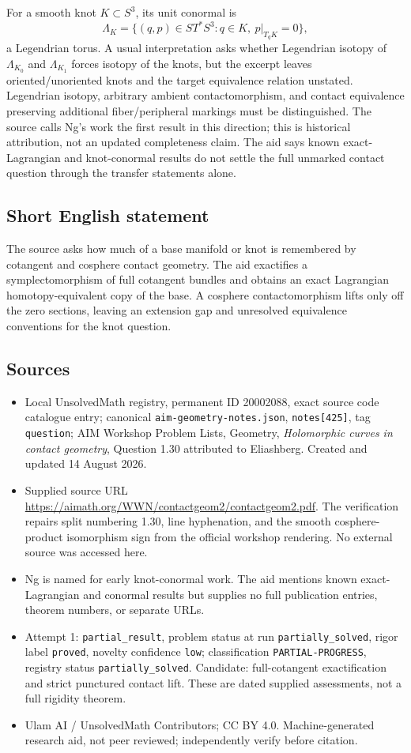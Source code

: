 \documentclass[11pt]{article}
\begin{document}
For a smooth knot \(K\subset S^3\), its unit conormal is
\[
 \Lambda_K=\{(q,p)\in ST^*S^3:q\in K,\ p|_{T_qK}=0\},
\]
a Legendrian torus. A usual interpretation asks whether Legendrian isotopy of \(\Lambda_{K_0}\) and \(\Lambda_{K_1}\) forces isotopy of the knots, but the excerpt leaves oriented/unoriented knots and the target equivalence relation unstated. Legendrian isotopy, arbitrary ambient contactomorphism, and contact equivalence preserving additional fiber/peripheral markings must be distinguished. The source calls Ng's work the first result in this direction; this is historical attribution, not an updated completeness claim. The aid says known exact-Lagrangian and knot-conormal results do not settle the full unmarked contact question through the transfer statements alone.
\subsection{Short English statement}
The source asks how much of a base manifold or knot is remembered by cotangent and cosphere contact geometry. The aid exactifies a symplectomorphism of full cotangent bundles and obtains an exact Lagrangian homotopy-equivalent copy of the base. A cosphere contactomorphism lifts only off the zero sections, leaving an extension gap and unresolved equivalence conventions for the knot question.
\subsection{Sources}
\begin{itemize}
\item Local UnsolvedMath registry, permanent ID 20002088, exact source code catalogue entry; canonical \texttt{aim-geometry-notes.json}, \texttt{notes[425]}, tag \texttt{question}; AIM Workshop Problem Lists, Geometry, \emph{Holomorphic curves in contact geometry}, Question 1.30 attributed to Eliashberg. Created and updated 14 August 2026.
\item Supplied source URL \url{https://aimath.org/WWN/contactgeom2/contactgeom2.pdf}. The verification repairs split numbering 1.30, line hyphenation, and the smooth cosphere-product isomorphism sign from the official workshop rendering. No external source was accessed here.
\item Ng is named for early knot-conormal work. The aid mentions known exact-Lagrangian and conormal results but supplies no full publication entries, theorem numbers, or separate URLs.
\item Attempt 1: \texttt{partial\_result}, problem status at run \texttt{partially\_solved}, rigor label \texttt{proved}, novelty confidence \texttt{low}; classification \texttt{PARTIAL-PROGRESS}, registry status \texttt{partially\_solved}. Candidate: full-cotangent exactification and strict punctured contact lift. These are dated supplied assessments, not a full rigidity theorem.
\item Ulam AI / UnsolvedMath Contributors; CC BY 4.0. Machine-generated research aid, not peer reviewed; independently verify before citation.
\end{itemize}
\end{document}
